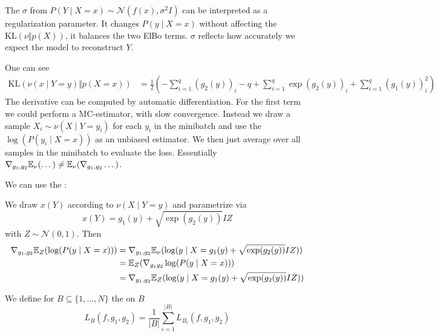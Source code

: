 \begin{remark}
    The $\sigma$ from $P(Y\mid X=x)\sim\mathcal{N}(f(x),\sigma^2I)$ can be interpreted as a regularization parameter.
    It changes $P(y\mid X=x)$ without affecting the $\text{KL}(\nu\Vert p(X))$, 
    it balances the two ElBo terms. $\sigma$ reflects how accurately we expect the model to reconstruct 
    $Y$. 

\end{remark}

One can see \begin{align*}
    \text{KL}(\nu(x\mid Y=y)\Vert p(X=x))&=\frac{1}{2}\left(-\sum_{i=1}^q(g_2(y))_i-q+\sum_{i=1}^q \exp(g_2(y))_i+\sum_{i=1}^q(g_1(y))_i^2\right)
\end{align*}
The derivative can be computed by automatic differentiation. For the first term we could 
perform a MC-estimator, with slow convergence. Instead we draw a sample $X_i\sim\nu(X\mid Y=y_i)$ for each $y_i$ in the minibatch
and use the  $\log(P(y_i\mid X=x))$ as an unbiased estimator. We then just average 
over all samples in the minibatch to evaluate the loss. Essentially $\nabla_{g_1,g_2}\mathbb{E}_\nu(\dots)\neq \mathbb{E}_\nu(\nabla_{g_1,g_2}\dots)$.

We can use the :

We draw $x(Y)$ according to $\nu(X\mid Y=y)$ and 
parametrize via 
\[x(Y)=g_1(y)+\sqrt{\exp(g_2(y))}IZ\]
with $Z\sim\mathcal{N}(0,1)$.
Then \begin{align*}
    \nabla_{g_1,g_2}\mathbb{E}_Z(\log(P(y\mid X=x))) &=\nabla_{g_1,g_2}\mathbb{E}_\nu(\log(y\mid X=g_1(y)+\sqrt{\exp(g_2(y))}IZ))\\
    &=\mathbb{E}_Z(\nabla_{g_1g_2}\log(P(y\mid X=x))) \\
    &=\nabla_{g_1,g_2}\mathbb{E}_Z(\log(y\mid X=g_1(y)+\sqrt{\exp(g_2(y))}IZ))
\end{align*}


We define for $B\subseteq\{1,\dots,N\}$ the  on $B$
\[L_B(f,g_1,g_2)=\frac{1}{|B|}\sum_{i=1}^{|B|}L_{B_i}(f,g_1,g_2)\]

